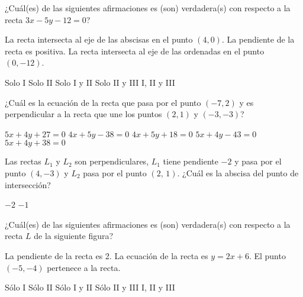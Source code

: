 \documentclass[sin nombre]{srs2}
\begin{document}
\begin{preguntas}
\pregunta ¿Cuál(es) de las siguientes afirmaciones es (son) verdadera(s) con respecto a la recta $3x - 5y - 12 = 0$?
\begin{opciones}
\opcion La recta intersecta al eje de las abscisas en el punto $\left(4, 0\right)$.
\opcion La pendiente de la recta es positiva.
\opcion La recta intersecta al eje de las ordenadas en el punto $\left(0, -12\right)$.
\end{opciones}
\begin{alternativas}
\alternativa Solo I
\alternativa Solo II
\alternativa Solo I y II
\alternativa Solo II y III
\alternativa I, II y III
\end{alternativas}

\pregunta ¿Cuál es la ecuación de la recta que pasa por el punto $\left(-7, 2\right)$ y es perpendicular a la recta que une los puntos $\left(2,1\right)$ y $\left(-3,-3\right)$?
\begin{alternativas}
\alternativa $5x + 4y + 27 = 0$
\alternativa $4x + 5y - 38 = 0$
\alternativa $4x + 5y + 18 = 0$
\alternativa $5x + 4y - 43 = 0$
\alternativa $5x + 4y + 38 = 0$
\end{alternativas}

\pregunta Las rectas $L_1$ y $L_2$ son perpendiculares, $L_1$ tiene pendiente $-2$ y pasa por el punto $\left(4, -3\right)$ y $L_2$ pasa por el punto $\left(2,\,1\right)$. ¿Cuál es la abscisa del punto de intersección?
\begin{alternativas}
\alternativa $-2$
\alternativa $-1$
\end{alternativas}

\pregunta ¿Cuál(es) de las siguientes afirmaciones es (son) verdadera(s) con respecto a la recta $L$ de la siguiente figura?
\begin{columnas}[0.65]
\begin{opciones}
\opcion La pendiente de la recta es 2.
\opcion La ecuación de la recta es $y = 2x + 6$.
\opcion El punto $\left(-5, -4\right)$ pertenece a la recta.
\end{opciones}
\begin{alternativas}
\alternativa Sólo I
\alternativa Sólo II
\alternativa Sólo I y II
\alternativa Sólo II y III
\alternativa I, II y III
\end{alternativas}
\siguiente
{}
\end{columnas}



\end{preguntas}
\end{document}
